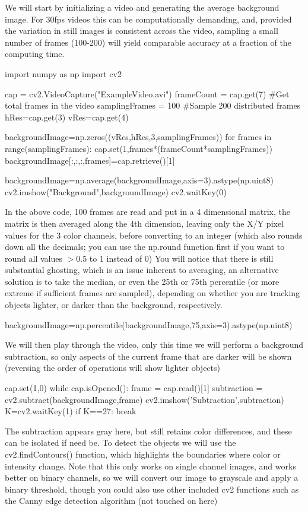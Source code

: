 \documentclass[a4paper,12pt]{article}
\begin{document}
We will start by initializing a video and generating the average background image. For 30fps videos this can be computationally demanding, and, provided the variation in still images is consistent across the video, sampling a small number of frames (100-200) will yield comparable accuracy at a fraction of the computing time.

\begin{python}
import numpy as np
import cv2

cap = cv2.VideoCapture("ExampleVideo.avi")
frameCount = cap.get(7) #Get total frames in the video
samplingFrames = 100 #Sample 200 distributed frames
hRes=cap.get(3)
vRes=cap.get(4)

backgroundImage=np.zeros((vRes,hRes,3,samplingFrames))
for frames in range(samplingFrames):
	cap.set(1,frames*(frameCount*samplingFrames))
	backgroundImage[:,:,:,frames]=cap.retrieve()[1]

backgroundImage=np.average(backgroundImage,axis=3).astype(np.uint8)
cv2.imshow("Background",backgroundImage)
cv2.waitKey(0)
\end{python}
In the above code, 100 frames are read and put in a 4 dimensional matrix, the matrix is then averaged along the 4th dimension, leaving only the X/Y pixel values for the 3 color channels, before converting to an integer (which also rounds down all the decimals; you can use the np.round function first if you want to round all values $>$0.5 to 1 instead of 0) You will notice that there is still substantial ghosting, which is an issue inherent to averaging, an alternative solution is to take the median, or even the 25th or 75th percentile (or more extreme if sufficient frames are sampled), depending on whether you are tracking objects lighter, or darker than the background, respectively.
\begin{python}
backgroundImage=np.percentile(backgroundImage,75,axis=3).astype(np.uint8)
\end{python}
We will then play through the video, only this time we will perform a background subtraction, so only aspects of the current frame that are darker will be shown (reversing the order of operations will show lighter objects)
\begin{python}
cap.set(1,0)
while cap.isOpened():
	frame = cap.read()[1]
	subtraction = cv2.subtract(backgroundImage,frame)
	cv2.imshow('Subtraction',subtraction)
	K=cv2.waitKey(1)
	if K==27:
		break
\end{python}
The subtraction appears gray here, but still retains color differences, and these can be isolated if need be. To detect the objects we will use the cv2.findContours() function, which highlights the boundaries where color or intensity change. Note that this only works on single channel images, and works better on binary channels, so we will convert our image to grayscale and apply a binary threshold, though you could also use other included cv2 functions such as the Canny edge detection algorithm (not touched on here)
\end{document}
